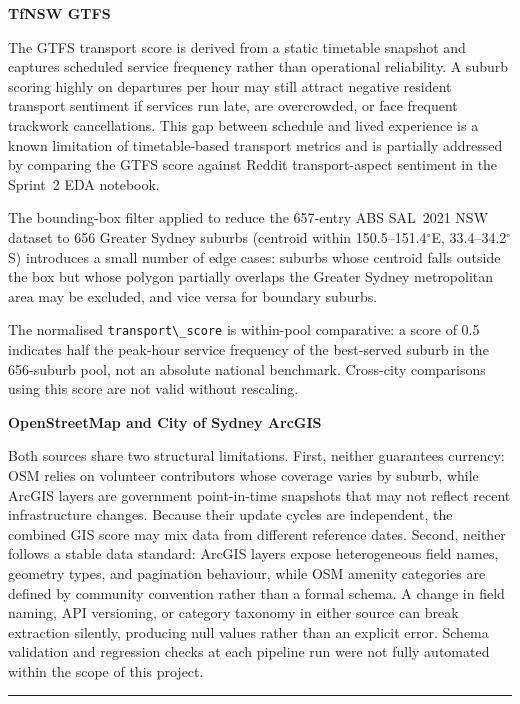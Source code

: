 \documentclass[11pt,a4paper]{article}
\newcommand{\passthrough}[1]{#1}
\begin{document}
\textbf{TfNSW GTFS}

The GTFS transport score is derived from a static timetable snapshot and captures scheduled service frequency rather than operational reliability. A suburb scoring highly on departures per hour may still attract negative resident transport sentiment if services run late, are overcrowded, or face frequent trackwork cancellations. This gap between schedule and lived experience is a known limitation of timetable-based transport metrics and is partially addressed by comparing the GTFS score against Reddit transport-aspect sentiment in the Sprint~2 EDA notebook.

The bounding-box filter applied to reduce the 657-entry ABS SAL~2021 NSW dataset to 656 Greater Sydney suburbs (centroid within 150.5--151.4$^\circ$E, 33.4--34.2$^\circ$S) introduces a small number of edge cases: suburbs whose centroid falls outside the box but whose polygon partially overlaps the Greater Sydney metropolitan area may be excluded, and vice versa for boundary suburbs.

The normalised \passthrough{\lstinline!transport\_score!} is within-pool comparative: a score of 0.5 indicates half the peak-hour service frequency of the best-served suburb in the 656-suburb pool, not an absolute national benchmark. Cross-city comparisons using this score are not valid without rescaling.

\textbf{OpenStreetMap and City of Sydney ArcGIS}

Both sources share two structural limitations. First, neither guarantees currency: OSM relies on volunteer contributors whose coverage varies by suburb, while ArcGIS layers are government point-in-time snapshots that may not reflect recent infrastructure changes. Because their update cycles are independent, the combined GIS score may mix data from different reference dates. Second, neither follows a stable data standard: ArcGIS layers expose heterogeneous field names, geometry types, and pagination behaviour, while OSM amenity categories are defined by community convention rather than a formal schema. A change in field naming, API versioning, or category taxonomy in either source can break extraction silently, producing null values rather than an explicit error. Schema validation and regression checks at each pipeline run were not fully automated within the scope of this project.



\begin{center}\rule{0.5\linewidth}{0.5pt}\end{center}
\end{document}
